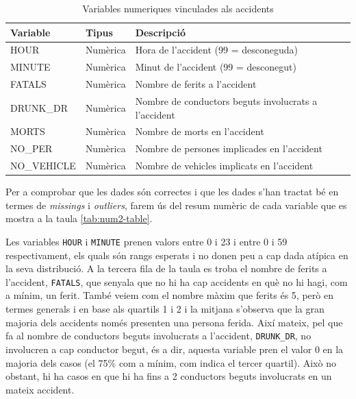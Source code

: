 \documentclass[12pt,longbibliography]{article}
\theoremstyle{definition}
\theoremstyle{remark}
\begin{document}
\begin{table}[H]
\centering
\begin{tabular}{lll}
\hline
Variable    & Tipus    & Descripció                                           \\ \hline
HOUR        & Numèrica & Hora de l’accident (99 = desconeguda)                \\
MINUTE      & Numèrica & Minut de l’accident (99 = desconegut)                \\
FATALS      & Numèrica & Nombre de ferits a l’accident                        \\
DRUNK\_DR   & Numèrica & Nombre de conductors beguts involucrats a l’accident \\
MORTS       & Numèrica & Nombre de morts en l’accident                        \\
NO\_PER     & Numèrica & Nombre de persones implicades en l’accident          \\
NO\_VEHICLE & Numèrica & Nombre de vehicles implicats en l’accident           \\ \hline
\end{tabular}
\caption{Variables numeriques vinculades als accidents}
\label{tab:num-table}
\end{table}

Per a comprobar que les dades són correctes i que les dades s'han tractat bé en termes de \emph{missings} i \emph{outliers}, farem ús del resum numèric de cada variable que es mostra a la taula \ref{tab:num2-table}. 

Les variables \texttt{HOUR} i \texttt{MINUTE} prenen valors entre 0 i 23 i entre 0 i 59 respectivament, els quals són rangs esperats i no donen peu a cap dada atípica en la seva distribució. A la tercera fila de la taula es troba el nombre de ferits a l'accident, \texttt{FATALS}, que senyala que no hi ha cap accidents en què no hi hagi, com a mínim, un ferit. També veiem com el nombre màxim que ferits és 5, però en termes generals i en base als quartils 1 i 2 i la mitjana s'observa que la gran majoria dels accidents només presenten una persona ferida. Així mateix, pel que fa al nombre de conductors beguts involucrats a l'accident, \texttt{DRUNK\_DR}, no involucren a cap conductor begut, és a dir, aquesta variable pren el valor 0 en la majoria dels casos (el 75\% com a mínim, com indica el tercer quartil). Això no obstant, hi ha casos en que hi ha fins a 2 conductors beguts involucrats en un mateix accident. 
\end{document}
